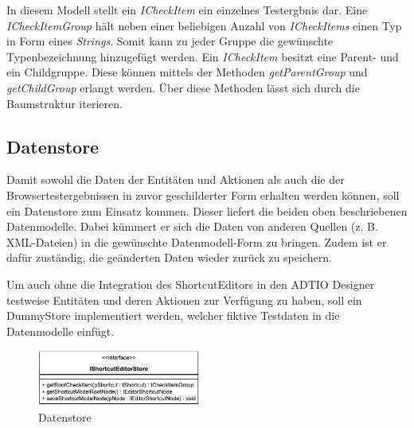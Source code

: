 In diesem Modell stellt ein \emph{ICheckItem} ein einzelnes Testergbnis dar. Eine \emph{ICheckItemGroup} hält neben einer beliebigen Anzahl von \emph{ICheckItems} einen Typ in Form eines \emph{Strings}. Somit kann zu jeder Gruppe die gewünschte Typenbezeichnung hinzugefügt werden. Ein \emph{ICheckItem} besitzt eine Parent- und ein Childgruppe. Diese können mittels der Methoden \emph{getParentGroup} und \emph{getChildGroup} erlangt werden. Über diese Methoden lässt sich durch die Baumstruktur iterieren.

\vspace{-5px}

\subsection{Datenstore}

Damit sowohl die Daten der Entitäten und Aktionen als auch die der Browsertestergebnissen in zuvor geschilderter Form erhalten werden können, soll ein Datenstore zum Einsatz kommen. Dieser liefert die beiden oben beschriebenen Datenmodelle. Dabei kümmert er sich die Daten von anderen Quellen (z. B. XML-Dateien) in die gewünschte Datenmodell-Form zu bringen. Zudem ist er dafür zuständig, die geänderten Daten wieder zurück zu speichern.

Um auch ohne die Integration des ShortcutEditors in den ADTIO Designer testweise Entitäten und deren Aktionen zur Verfügung zu haben, soll ein DummyStore implementiert werden, welcher fiktive Testdaten in die Datenmodelle einfügt.

\vfill

\begin{figure}[H]
	\centering
	\includegraphics[height=70px]{../graphic/diagrams/CD_IShortcutEditorStore/IShortcutEditorStore}
	\caption{Datenstore}
	\label{fig:ishortcuteditorstore}
\end{figure}



\newpage